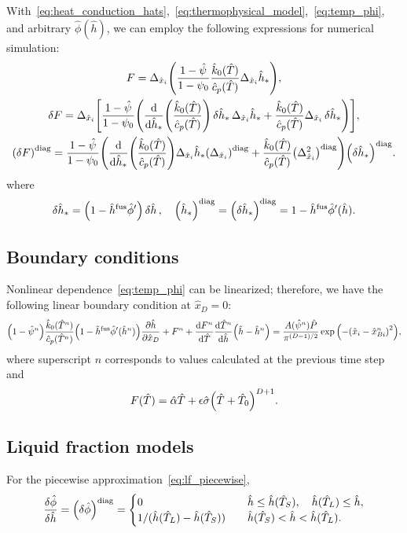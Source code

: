 \documentclass{article}
\newcommand{\dder}[2][]{\Delta_{#2}#1}
\newcommand{\diag}[1]{\qty(#1)^\mathrm{diag}}
\newcommand{\fusion}[1]{{#1}^\mathrm{fus}}
\newcommand{\Hx}{\hat{x}}
\newcommand{\Hh}{\hat{h}}
\newcommand{\HT}{\hat{T}}
\newcommand{\HP}{\hat{P}}
\newcommand{\Halpha}{\hat{\alpha}}
\newcommand{\Hsigma}{\hat{\sigma}}
\newcommand{\Hc}{\hat{c}}
\newcommand{\Hk}{\hat{k}}
\newcommand{\Hphi}{\hat{\phi}}
\newcommand{\Hpsi}{\hat{\psi}}
\begin{document}
With~\eqref{eq:heat_conduction_hats},~\eqref{eq:thermophysical_model},~\eqref{eq:temp_phi},
and arbitrary \(\Hphi(\Hh)\), we can employ the following expressions for numerical simulation:
\begin{gather}
    F = \dder{\Hx_i}\qty(
        \frac{1 - \Hpsi}{1 - \psi_0} \frac{\Hk_0(\HT)}{\Hc_p(\HT)} \dder[\Hh_*]{\Hx_i}
	), \\
    \var{F} = \dder{\Hx_i}\qty[ \frac{1 - \Hpsi}{1 - \psi_0} \qty(
	    \dv{\Hh_*}(\frac{\Hk_0(\HT)}{\Hc_p(\HT)})\var{\Hh_*}\dder[\Hh_*]{\Hx_i} +
	    \frac{\Hk_0(\HT)}{\Hc_p(\HT)} \dder[\var{\Hh_*}]{\Hx_i}
	)], \\
    \diag{\var{F}} = \frac{1 - \Hpsi}{1 - \psi_0} \qty(
	    \dv{\Hh_*}(\frac{\Hk_0(\HT)}{\Hc_p(\HT)})\dder[\Hh_*]{\Hx_i} \diag{\dder{\Hx_i}} +
	    \frac{\Hk_0(\HT)}{\Hc_p(\HT)} \diag{\dder{\Hx_i}^2}
	)\diag{\var{\Hh_*}}.
\end{gather}
where
\begin{equation}
    \var{\Hh_*} = \qty(1 - \fusion{\Hh}\hat\phi')\var{\Hh}, \quad
    \diag{\Hh_*} = \diag{\var{\Hh_*}} = 1 - \fusion{\Hh}\hat\phi'(\Hh).
\end{equation}

\subsection{Boundary conditions}

Nonlinear dependence~\eqref{eq:temp_phi} can be linearized; therefore, we have the following linear boundary condition at \(\Hx_D=0\):
\begin{equation}\label{eq:bc_linearized}
    \qty(1 - \Hpsi^n) \frac{\Hk_0(\HT^n)}{\Hc_p(\HT^n)} \qty(1-\fusion{\Hh}\hat\phi'(\Hh^n))\pdv{\Hh}{\Hx_D} +
	    F^n + \dv{F^n}{\HT}\dv{\HT^n}{\Hh}\qty(\Hh - \Hh^n) =
	    \frac{A(\Hpsi^n)\HP}{\pi^{(D-1)/2}}\exp\qty( -\qty(\Hx_i-\Hx_{Bi}^n)^2 ),
\end{equation}
where superscript \(n\) corresponds to values calculated at the previous time step and
\begin{equation}\label{eq:bc_Dirichlet_part}
    F(\HT) = \Halpha\HT + \epsilon\Hsigma\qty(\HT + \HT_0)^{D+1}.
\end{equation}

\subsection{Liquid fraction models}

For the piecewise approximation~\eqref{eq:lf_piecewise},
\begin{equation}
	\fdv{\Hphi}{\Hh} = \diag{\var{\Hphi}} = \begin{cases}
        0 & \quad \Hh \leq \Hh(\HT_S), \quad \Hh(\HT_L) \leq \Hh, \\
        1/(\Hh(\HT_L)-\Hh(\HT_S)) & \quad \Hh(\HT_S) < \Hh < \Hh(\HT_L). \\
    \end{cases} \label{eq:pert_phi_h_diag}
\end{equation}
\end{document}
